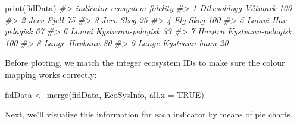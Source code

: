 \documentclass[
]{book}
\newenvironment{Shaded}{\begin{snugshade}}{\end{snugshade}}
\newcommand{\AttributeTok}[1]{\textcolor[rgb]{0.77,0.63,0.00}{#1}}
\newcommand{\CommentTok}[1]{\textcolor[rgb]{0.56,0.35,0.01}{\textit{#1}}}
\newcommand{\ConstantTok}[1]{\textcolor[rgb]{0.00,0.00,0.00}{#1}}
\newcommand{\FunctionTok}[1]{\textcolor[rgb]{0.00,0.00,0.00}{#1}}
\newcommand{\NormalTok}[1]{#1}
\newcommand{\OtherTok}[1]{\textcolor[rgb]{0.56,0.35,0.01}{#1}}
\begin{document}
\begin{Shaded}
\begin{Highlighting}[]
\FunctionTok{print}\NormalTok{(fidData)}
\CommentTok{\#\textgreater{}     indicator         ecosystem fidelity}
\CommentTok{\#\textgreater{} 1 Dikesoldogg           Våtmark      100}
\CommentTok{\#\textgreater{} 2        Jerv             Fjell       75}
\CommentTok{\#\textgreater{} 3        Jerv              Skog       25}
\CommentTok{\#\textgreater{} 4         Elg              Skog      100}
\CommentTok{\#\textgreater{} 5       Lomvi      Hav{-}pelagisk       67}
\CommentTok{\#\textgreater{} 6       Lomvi Kystvann{-}pelagisk       33}
\CommentTok{\#\textgreater{} 7      Havørn Kystvann{-}pelagisk      100}
\CommentTok{\#\textgreater{} 8       Lange           Havbunn       80}
\CommentTok{\#\textgreater{} 9       Lange     Kystvann{-}bunn       20}
\end{Highlighting}
\end{Shaded}

Before plotting, we match the integer ecosystem IDs to make sure the colour mapping works correctly:

\begin{Shaded}
\begin{Highlighting}[]
\NormalTok{fidData }\OtherTok{\textless{}{-}} \FunctionTok{merge}\NormalTok{(fidData, EcoSysInfo, }\AttributeTok{all.x =} \ConstantTok{TRUE}\NormalTok{)}
\end{Highlighting}
\end{Shaded}

Next, we'll visualize this information for each indicator by means of pie charts.
\end{document}
